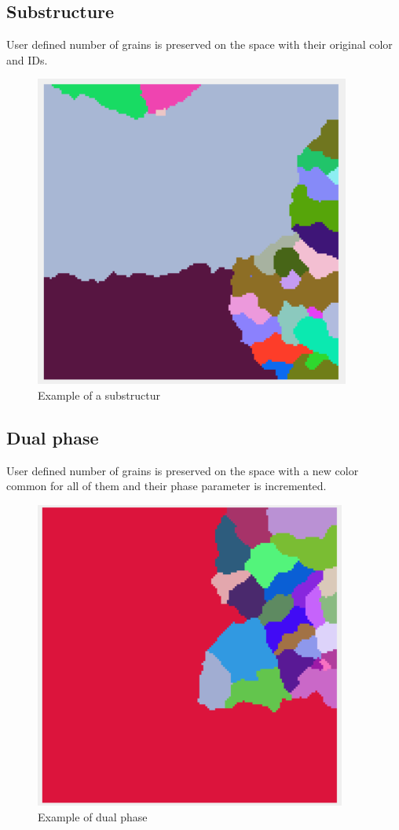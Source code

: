 \documentclass[a4paper, 11pt]{article}
\begin{document}
\subsection{Substructure}
User defined number of grains is preserved on the space with their original color and IDs.
\begin{figure}[H]
\centering
  \includegraphics[]{SubstructureExample}
  \caption{Example of a substructur}
  \label{fig:boat1}
\end{figure}
\subsection{Dual phase}
User defined number of grains is preserved on the space with a new color common for all of them and their phase parameter is incremented.
\begin{figure}[H]
\centering
  \includegraphics{DualPhaseExample}
  \caption{Example of dual phase}
  \label{fig:boat1}
\end{figure}
\end{document}
